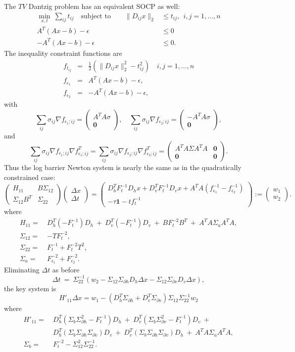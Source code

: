 \documentclass{article}
\newcommand{\bpm}{\left(\begin{matrix}}
\newcommand{\epm}{\end{matrix}\right)}
\newcommand{\grad}{\nabla}
\newcommand{\dx}{\Delta x}
\newcommand{\dt}{\Delta t}
\newcommand{\<}{\langle}
\renewcommand{\>}{\rangle}
\newcommand{\vzero}{\mathbf{0}}
\begin{document}
The $TV$ Dantzig problem has an equivalent SOCP as well:
\begin{align*}
\min_{x,t}~\sum_{ij} t_{ij}
\quad\text{subject to}\quad\quad
\|D_{ij} x\|_2 & \leq t_{ij}, ~~ i,j=1,\ldots,n \\[-4mm]
A^T(Ax-b) -\epsilon & \leq 0 \\
-A^T(Ax-b) -\epsilon & \leq 0.
\end{align*}
%
The inequality constraint functions are
\begin{eqnarray*}
f_{t_{ij}} & = & \frac{1}{2}\left( \|D_{ij}x\|^2_2 - t_{ij}^2\right) \quad i,j=1,\ldots,n\\
f_{\epsilon_1} & = & A^T(Ax-b)-\epsilon, \\
f_{\epsilon_2} & = & -A^T(Ax-b)-\epsilon,
\end{eqnarray*}
with
\[
\sum_{ij}\sigma_{ij} \grad f_{\epsilon_1;ij} = 
\bpm A^TA\sigma \\ \vzero \epm, \quad
\sum_{ij}\sigma_{ij} \grad f_{\epsilon_2;ij} = 
\bpm -A^TA\sigma \\ \vzero \epm,
\]
and
\[
\sum_{ij} \sigma_{ij} \grad f_{\epsilon_1;ij} \grad f_{\epsilon_1;ij}^T = 
\sum_{ij} \sigma_{ij} \grad f_{\epsilon_2;ij} \grad f_{\epsilon_2;ij}^T =
\bpm A^TA\Sigma A^TA & \vzero \\ \vzero & \vzero \epm.
\]
Thus the log barrier Newton system is nearly the same as in the quadratically constrained case:
\[
\bpm H_{11} & B\Sigma_{12} \\
\Sigma_{12}B^T & \Sigma_{22} \epm
\bpm \dx \\ \dt \epm =
\bpm D_h^T F_t^{-1}D_h x + D_v^TF_t^{-1}D_v x + 
A^TA(f_{\epsilon_1}^{-1}-f_{\epsilon_2}^{-1}) \\
-\tau\mathbf{1} - tf^{-1}_t \epm :=
\bpm w_1 \\ w_2 \epm.
\]
where
\begin{align*}
H_{11} = ~& D_h^T(-F_t^{-1})D_h ~+~ D_v^T(-F_t^{-1})D_v ~+~ B F_t^{-2}B^T ~+~ A^TA\Sigma_a A^TA, \\
\Sigma_{12} = ~& -TF_t^{-2}, \\
\Sigma_{22} = ~& F_t^{-1} + F_t^{-2}T^2, \\
\Sigma_a = ~& F_{\epsilon_1}^{-2} + F_{\epsilon_2}^{-2}.
\end{align*}
Eliminating $\dt$ as before
\[
\dt ~=~ \Sigma_{22}^{-1}(w_2 - \Sigma_{12}\Sigma_{\partial h}D_h\dx - 
\Sigma_{12}\Sigma_{\partial v}D_v\dx),
\]
the key system is
\[
H'_{11}\dx  =  
w_1 - (D_h^T\Sigma_{\partial h} + D_v^T\Sigma_{\partial v} )\Sigma_{12}\Sigma_{22}^{-1}w_2
\]
where
\begin{align*}
H'_{11} = ~& D_h^T(\Sigma_b\Sigma^2_{\partial h}-F_t^{-1})D_h ~+~
D_v^T(\Sigma_b\Sigma^2_{\partial v}-F_t^{-1})D_v ~+~\\
~& D_h^T(\Sigma_b\Sigma_{\partial h}\Sigma_{\partial v})D_v ~+~
D_v^T(\Sigma_b\Sigma_{\partial h}\Sigma_{\partial v})D_h ~+~ 
A^TA\Sigma_a A^TA, \\
\Sigma_b = ~& F_t^{-2} - \Sigma_{12}^2\Sigma_{22}^{-1}.
\end{align*}






\vspace{10mm}



\end{document}
